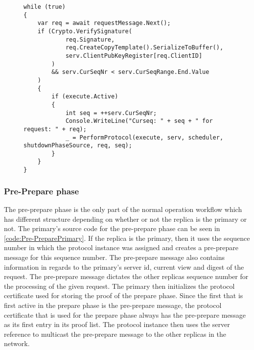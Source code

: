 \begin{figure}[H]
	\centering
	\begin{lstlisting}[label = code:StartProtocol, caption=Code section from the request handler, captionpos = b, basicstyle=\scriptsize]
while (true)
{
    var req = await requestMessage.Next();
    if (Crypto.VerifySignature(
            req.Signature, 
            req.CreateCopyTemplate().SerializeToBuffer(), 
            serv.ClientPubKeyRegister[req.ClientID]
        ) 
        && serv.CurSeqNr < serv.CurSeqRange.End.Value
    )
    {
        if (execute.Active)
        {
            int seq = ++serv.CurSeqNr;
            Console.WriteLine("Curseq: " + seq + " for request: " + req);
            _ = PerformProtocol(execute, serv, scheduler, shutdownPhaseSource, req, seq);
        }
    }
}
	\end{lstlisting}
\end{figure}

\subsubsection{Pre-Prepare phase}
The pre-prepare phase is the only part of the normal operation workflow which has different structure depending on whether or not the replica is the primary or not. The primary's source code for the pre-prepare phase can be seen in \autoref{code:Pre-PreparePrimary}. If the replica is the primary, then it uses the sequence number in which the protocol instance was assigned and creates a pre-prepare message for this sequence number. The pre-prepare message also contains information in regards to the primary’s server id, current view and digest of the request. The pre-prepare message dictates the other replicas sequence number for the processing of the given request. The primary then initializes the protocol certificate used for storing the proof of the prepare phase. Since the first  that is first active in the prepare phase is the pre-prepare message, the protocol certificate that is used for the prepare phase always has the pre-prepare message as its first entry in its proof list. The protocol instance then uses the server reference to multicast the pre-prepare message to the other replicas in the network. 

